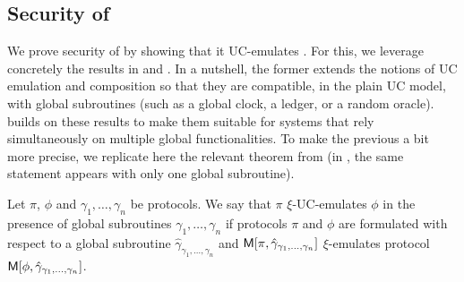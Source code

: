 \subsection{Security of \RealPKIDIDAtala}
\label{ssec:sec-didatala}


We prove security of \RealPKIDIDAtala by showing that it UC-emulates
\IdealGPKIDID. For this, we leverage concretely the results in \cite{bch+20} and
\cite{bhz21}. In a nutshell, the former extends the notions of UC emulation and
composition so that they are compatible, in the plain UC model, with global
subroutines (such as a global clock, a ledger, or a random oracle).
\cite{bhz21} builds on these results to make them suitable for systems that rely
simultaneously on multiple global functionalities.
%
To make the previous a bit more precise, we replicate here the relevant theorem
from \cite{bhz21} (in \cite{bch+20}, the same statement appears with only one
global subroutine).

\begin{theorem}
  \label{thm:uc-bhz21}
  Let $\pi$, $\phi$ and $\gamma_1,\dots,\gamma_n$ be protocols. We say that
  $\pi$ $\xi$-UC-emulates $\phi$ in the presence of global subroutines
  $\gamma_1,\dots,\gamma_n$ if protocols $\pi$ and $\phi$ are formulated with
  respect to a global subroutine $\hat{\gamma}_{\gamma_1,\dots,\gamma_n}$ and
  $\mathsf{M}[\pi,\hat{\gamma}_{\gamma_1,\dots,\gamma_n}]$ $\xi$-emulates protocol
  $\mathsf{M}[\phi,\hat{\gamma}_{\gamma_1,\dots,\gamma_n}]$.
\end{theorem}

